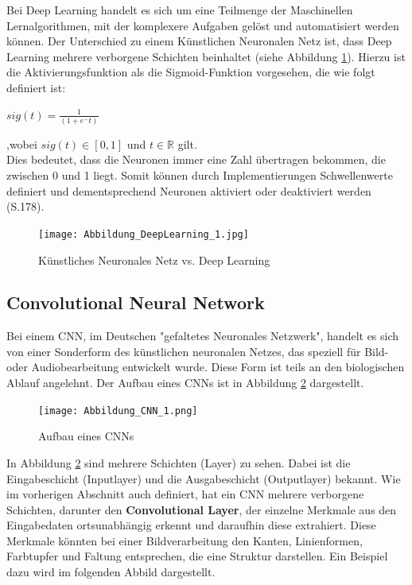 \documentclass[12pt]{scrreprt}
\begin{document}
Bei Deep Learning handelt es sich um eine Teilmenge der Maschinellen Lernalgorithmen, mit der komplexere Aufgaben gelöst und automatisiert werden können. Der Unterschied zu einem Künstlichen Neuronalen Netz ist, dass Deep Learning mehrere verborgene Schichten beinhaltet (siehe Abbildung \ref{fig:fig4}). Hierzu ist die Aktivierungsfunktion als die Sigmoid-Funktion vorgesehen, die wie folgt definiert ist:

\begin{center}
	$sig(t) = \frac{1}{(1 + e^-t)}$\\
\end{center}

,wobei $sig(t) \in [0,1]$ und $ t \in \mathbb{R}$ gilt. 
\\

Dies bedeutet, dass die Neuronen immer eine Zahl übertragen bekommen, die zwischen 0 und 1 liegt. Somit können durch Implementierungen Schwellenwerte definiert und dementsprechend Neuronen aktiviert oder deaktiviert werden \cite{Frochte2021}(S.178). \\

\begin{figure}[h!]
	\centering
	\texttt{[image: Abbildung\_DeepLearning\_1.jpg]}
	\caption{Künstliches Neuronales Netz vs. Deep Learning \cite{Abbildung4}}
	\label{fig:fig4}
\end{figure}

\subsection{Convolutional Neural Network}

Bei einem CNN, im Deutschen "gefaltetes Neuronales Netzwerk", handelt es sich von einer Sonderform des künstlichen neuronalen Netzes, das speziell für Bild- oder Audiobearbeitung entwickelt wurde. Diese Form ist teils an den biologischen Ablauf angelehnt.\cite{Luber2019} Der Aufbau eines CNNs ist in Abbildung \ref{fig:fig5} dargestellt.

\begin{figure}[h!]
	\centering
	\texttt{[image: Abbildung\_CNN\_1.png]}
	\caption{Aufbau eines CNNs \cite{Abbildung5}}
	\label{fig:fig5}
\end{figure}

In Abbildung \ref{fig:fig5} sind mehrere Schichten (Layer) zu sehen. Dabei ist die Eingabeschicht (Inputlayer) und die Ausgabeschicht (Outputlayer) bekannt. Wie im vorherigen Abschnitt auch definiert, hat ein CNN mehrere verborgene Schichten, darunter den \textbf{Convolutional Layer}, der einzelne Merkmale aus den Eingabedaten ortsunabhängig erkennt und daraufhin diese extrahiert. Diese Merkmale könnten bei einer Bildverarbeitung den Kanten, Linienformen, Farbtupfer und Faltung entsprechen, die eine Struktur darstellen. Ein Beispiel dazu wird im folgenden Abbild dargestellt.\\
\end{document}
